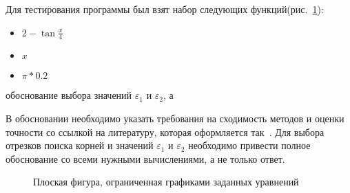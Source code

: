 \documentclass[a4paper,12pt,titlepage,finall]{article}
\begin{document}
Для тестирования программы был взят набор следующих функций(рис.~\ref{plot1}):
\begin{itemize}
  \item {$2-\tan{\frac{x}{4}}$}
  \item {$x$}
  \item {$\pi*0.2$}
\end{itemize}

обоснование выбора значений $\varepsilon_1$ и $\varepsilon_2$, а

В обосновании необходимо указать требования на сходимость методов и оценки точности со ссылкой на
литературу, которая оформляется так~\cite{math}. Для выбора отрезков поиска корней и значений $\varepsilon_1$ и $\varepsilon_2$ необходимо
привести полное обоснование со всеми нужными вычислениями, а не только ответ.

\begin{figure}[h]
\centering
{}
\caption{Плоская фигура, ограниченная графиками заданных уравнений}
\label{plot1}
\end{figure}
\end{document}
